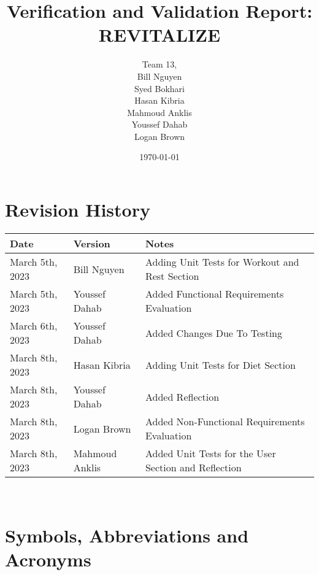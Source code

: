 \documentclass[12pt, titlepage]{article}
\begin{document}
\title{Verification and Validation Report: REVITALIZE} 
\author{Team 13, 
\\ Bill Nguyen
\\ Syed Bokhari
\\ Hasan Kibria
\\ Mahmoud Anklis
\\ Youssef Dahab
\\ Logan Brown}
\date{\today}

\maketitle


\section{Revision History}

\begin{tabularx}{\textwidth}{p{3cm}p{2cm}X}
\toprule {\bf Date} & {\bf Version} & {\bf Notes}\\
\midrule
March 5th, 2023 & Bill Nguyen & Adding Unit Tests for Workout and Rest Section\\
March 5th, 2023 & Youssef Dahab & Added Functional Requirements Evaluation\\
March 6th, 2023 & Youssef Dahab & Added Changes Due To Testing\\
March 8th, 2023 & Hasan Kibria & Adding Unit Tests for Diet Section\\
March 8th, 2023 & Youssef Dahab & Added Reflection\\
March 8th, 2023 & Logan Brown & Added Non-Functional Requirements Evaluation\\
March 8th, 2023 & Mahmoud Anklis & Added Unit Tests for the User Section and Reflection\\
\bottomrule
\end{tabularx}

~\newpage

\section{Symbols, Abbreviations and Acronyms}
\end{document}
